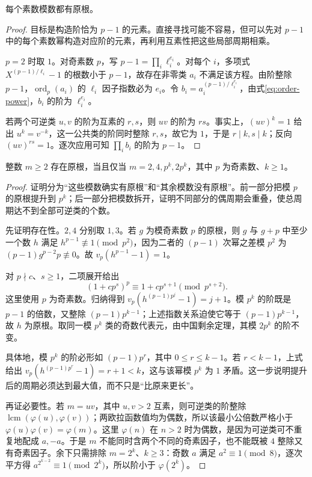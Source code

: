 \begin{theorem}
\label{thm:prime-primitive-root}
每个素数模数都有原根。
\end{theorem}
\begin{proof}
目标是构造阶恰为 $p-1$ 的元素。直接寻找可能不容易，但可以先对 $p-1$ 中的每个素数幂构造对应阶的元素，再利用互素性把这些局部周期相乘。

$p=2$ 时取 $1$。对奇素数 $p$，写 $p-1=\prod_i\ell_i^{e_i}$。对每个 $i$，多项式 $X^{(p-1)/\ell_i}-1$ 的根数小于 $p-1$，故存在非零类 $a_i$ 不满足该方程。由阶整除 $p-1$，$\operatorname{ord}_p(a_i)$ 的 $\ell_i$ 因子指数必为 $e_i$。令 $b_i=a_i^{(p-1)/\ell_i^{e_i}}$，由式\eqref{eq:order-power}，$b_i$ 的阶为 $\ell_i^{e_i}$。

若两个可逆类 $u,v$ 的阶为互素的 $r,s$，则 $uv$ 的阶为 $rs$。事实上，$(uv)^k=1$ 给出 $u^k=v^{-k}$，这一公共类的阶同时整除 $r,s$，故它为 $1$，于是 $r\mid k,s\mid k$；反向 $(uv)^{rs}=1$。逐次应用可知 $\prod_i b_i$ 的阶为 $p-1$。
\end{proof}

\begin{theorem}[原根分类]
\label{thm:primitive-root-classification}
整数 $m\ge2$ 存在原根，当且仅当 $m=2,4,p^k,2p^k$，其中 $p$ 为奇素数、$k\ge1$。
\end{theorem}
\begin{proof}
证明分为“这些模数确实有原根”和“其余模数没有原根”。前一部分把模 $p$ 的原根提升到 $p^k$；后一部分把模数拆开，证明不同部分的偶周期会重叠，使总周期达不到全部可逆类的个数。

先证明存在性。$2,4$ 分别取 $1,3$。若 $g$ 为模奇素数 $p$ 的原根，则 $g$ 与 $g+p$ 中至少一个数 $h$ 满足 $h^{p-1}\not\equiv1\pmod{p^2}$，因为二者的 $(p-1)$ 次幂之差模 $p^2$ 为 $(p-1)g^{p-2}p\not\equiv0$。故 $v_p(h^{p-1}-1)=1$。

对 $p\nmid c$、$s\ge1$，二项展开给出
\[
 (1+cp^s)^p\equiv1+cp^{s+1}\pmod{p^{s+2}}.
\]
这里使用 $p$ 为奇素数。归纳得到 $v_p(h^{(p-1)p^j}-1)=j+1$。模 $p^k$ 的阶既是 $p-1$ 的倍数，又整除 $(p-1)p^{k-1}$；上述指数关系迫使它等于 $(p-1)p^{k-1}$，故 $h$ 为原根。取同一模 $p^k$ 类的奇数代表元，由中国剩余定理，其模 $2p^k$ 的阶不变。

具体地，模 $p^k$ 的阶必形如 $(p-1)p^r$，其中 $0\le r\le k-1$。若 $r<k-1$，上式给出 $v_p(h^{(p-1)p^r}-1)=r+1<k$，这与该幂模 $p^k$ 为 $1$ 矛盾。这一步说明提升后的周期必须达到最大值，而不只是“比原来更长”。

再证必要性。若 $m=uv$，其中 $u,v>2$ 互素，则可逆类的阶整除 $\operatorname{lcm}(\varphi(u),\varphi(v))$；两欧拉函数值均为偶数，所以该最小公倍数严格小于 $\varphi(u)\varphi(v)=\varphi(m)$。这里 $\varphi(n)$ 在 $n>2$ 时为偶数，是因为可逆类可不重复地配成 $a,-a$。于是 $m$ 不能同时含两个不同的奇素因子，也不能既被 $4$ 整除又有奇素因子。余下只需排除 $m=2^k$、$k\ge3$：奇数 $a$ 满足 $a^2\equiv1\pmod8$，逐次平方得 $a^{2^{k-2}}\equiv1\pmod{2^k}$，所以阶小于 $\varphi(2^k)$。
\end{proof}

